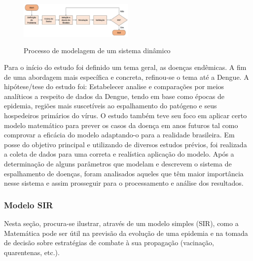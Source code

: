 \documentclass[conference]{IEEEtran}
\begin{document}
\begin{figure}[!ht]
  \caption{Processo de modelagem de um sistema dinâmico}
  \includegraphics[width=0.5\textwidth]{workflow.eps}
  \label{fig:processo}
\end{figure}

Para o início do estudo foi definido um tema geral, as doenças endêmicas. A fim de uma abordagem mais específica e concreta, refinou-se o tema até a Dengue. A hipótese/tese do estudo foi:
	Estabelecer analise e comparações por meios analíticos a respeito de dados da Dengue, tendo em base como épocas de epidemia, regiões mais suscetíveis ao espalhamento do patógeno e seus hospedeiros primários do vírus. O estudo também teve seu foco em aplicar certo modelo matemático para prever os casos da doença em anos futuros tal como comprovar a eficácia do modelo adaptando-o para a realidade brasileira.
    	Em posse do objetivo principal e utilizando de diversos estudos prévios, foi realizada a coleta de dados para uma correta e realística aplicação do modelo. Após a determinação de alguns parâmetros que modelam e descrevem o sistema de espalhamento de doenças, foram analisados aqueles que têm maior importância nesse sistema e assim prosseguir para o processamento e análise dos resultados.

\subsubsection{Modelo SIR}
Nesta seção, procura-se ilustrar, através de um modelo simples (SIR), como a Matemática pode ser útil na previsão da evolução de uma epidemia e na tomada de decisão sobre estratégias de combate à sua propagação (vacinação, quarentenas, etc.).
\end{document}

